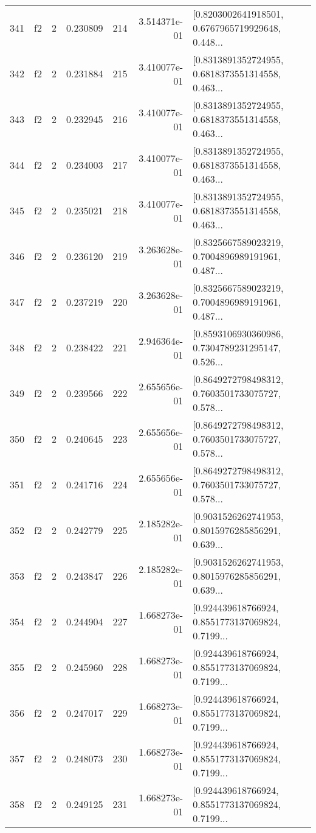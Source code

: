\begin{tabular}{lllrlrl}
341 &  f2 &   2 &  0.230809 &  214 &  3.514371e-01 &  [0.8203002641918501, 0.6767965719929648, 0.448... \\
342 &  f2 &   2 &  0.231884 &  215 &  3.410077e-01 &  [0.8313891352724955, 0.6818373551314558, 0.463... \\
343 &  f2 &   2 &  0.232945 &  216 &  3.410077e-01 &  [0.8313891352724955, 0.6818373551314558, 0.463... \\
344 &  f2 &   2 &  0.234003 &  217 &  3.410077e-01 &  [0.8313891352724955, 0.6818373551314558, 0.463... \\
345 &  f2 &   2 &  0.235021 &  218 &  3.410077e-01 &  [0.8313891352724955, 0.6818373551314558, 0.463... \\
346 &  f2 &   2 &  0.236120 &  219 &  3.263628e-01 &  [0.8325667589023219, 0.7004896989191961, 0.487... \\
347 &  f2 &   2 &  0.237219 &  220 &  3.263628e-01 &  [0.8325667589023219, 0.7004896989191961, 0.487... \\
348 &  f2 &   2 &  0.238422 &  221 &  2.946364e-01 &  [0.8593106930360986, 0.7304789231295147, 0.526... \\
349 &  f2 &   2 &  0.239566 &  222 &  2.655656e-01 &  [0.8649272798498312, 0.7603501733075727, 0.578... \\
350 &  f2 &   2 &  0.240645 &  223 &  2.655656e-01 &  [0.8649272798498312, 0.7603501733075727, 0.578... \\
351 &  f2 &   2 &  0.241716 &  224 &  2.655656e-01 &  [0.8649272798498312, 0.7603501733075727, 0.578... \\
352 &  f2 &   2 &  0.242779 &  225 &  2.185282e-01 &  [0.9031526262741953, 0.8015976285856291, 0.639... \\
353 &  f2 &   2 &  0.243847 &  226 &  2.185282e-01 &  [0.9031526262741953, 0.8015976285856291, 0.639... \\
354 &  f2 &   2 &  0.244904 &  227 &  1.668273e-01 &  [0.924439618766924, 0.8551773137069824, 0.7199... \\
355 &  f2 &   2 &  0.245960 &  228 &  1.668273e-01 &  [0.924439618766924, 0.8551773137069824, 0.7199... \\
356 &  f2 &   2 &  0.247017 &  229 &  1.668273e-01 &  [0.924439618766924, 0.8551773137069824, 0.7199... \\
357 &  f2 &   2 &  0.248073 &  230 &  1.668273e-01 &  [0.924439618766924, 0.8551773137069824, 0.7199... \\
358 &  f2 &   2 &  0.249125 &  231 &  1.668273e-01 &  [0.924439618766924, 0.8551773137069824, 0.7199... \\

\end{tabular}
